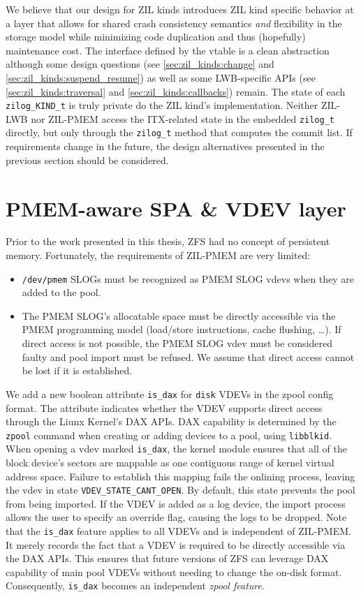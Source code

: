 \documentclass[12pt,a4paper,twoside]{book}
\begin{document}
We believe that our design for ZIL kinds introduces ZIL kind specific behavior at a layer that allows for shared crash consistency semantics \textit{and} flexibility in the storage model while minimizing code duplication and thus (hopefully) maintenance cost.
The interface defined by the vtable is a clean abstraction although some design questions (see \ref{sec:zil_kinds:change} and \ref{sec:zil_kinds:suspend_resume}) as well as some LWB-specific APIs (see \ref{sec:zil_kinds:traversal} and \ref{sec:zil_kinds:callbacks}) remain.
The state of each \lstinline{zilog_KIND_t} is truly private do the ZIL kind's implementation.
Neither ZIL-LWB nor ZIL-PMEM access the ITX-related state in the embedded \lstinline{zilog_t} directly, but only through the \lstinline{zilog_t} method that computes the commit list.
If requirements change in the future, the design alternatives presented in the previous section should be considered.

\section{PMEM-aware SPA \& VDEV layer}\label{sec:pmemspavdev}
Prior to the work presented in this thesis, ZFS had no concept of persistent memory.
Fortunately, the requirements of ZIL-PMEM are very limited:
\begin{itemize}[noitemsep]
    \item \texttt{/dev/pmem} SLOGs must be recognized as PMEM SLOG vdevs when they are added to the pool.
    \item The PMEM SLOG's allocatable space must be directly accessible via the PMEM programming model (load/store instructions, cache flushing, \dots).
        If direct access is not possible, the PMEM SLOG vdev must be considered faulty and pool import must be refused.
        We assume that direct access cannot be lost if it is established.
\end{itemize}

We add a new boolean attribute \lstinline{is_dax} for \lstinline{disk} VDEVs in the zpool config format.
The attribute indicates whether the VDEV supports direct access through the Liunx Kernel's DAX APIs.
DAX capability is determined by the \lstinline{zpool} command when creating or adding devices to a pool, using \lstinline{libblkid}.
When opening a vdev marked \lstinline{is_dax}, the kernel module ensures that all of the block device's sectors are mappable as one contiguous range of kernel virtual address space.
Failure to establish this mapping fails the onlining process, leaving the vdev in state \lstinline{VDEV_STATE_CANT_OPEN}.
By default, this state prevents the pool from being imported.
If the VDEV is added as a log device, the import process allows the user to specify an override flag, causing the logs to be dropped.
Note that the \lstinline{is_dax} feature applies to all VDEVs and is independent of ZIL-PMEM.
It merely records the fact that a VDEV is required to be directly accessible via the DAX APIs.
This ensures that future versions of ZFS can leverage DAX capability of main pool VDEVs without needing to change the on-disk format.
Consequently, \lstinline{is_dax} becomes an independent \textit{zpool feature}.
\end{document}
